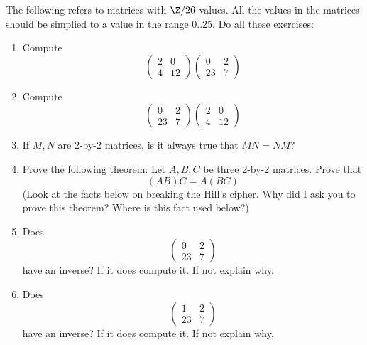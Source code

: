   The following refers to matrices with $\Z/26$ values.
  All the values in the matrices should be simplied to a value
  in the range 0..25.
  Do all these exercises:
  \begin{enumerate}[nosep]

  \item Compute
    \[
    \begin{pmatrix}
      2 & 0 \\
      4 & 12 
    \end{pmatrix}
    \begin{pmatrix}
      0 & 2 \\
      23 & 7 
    \end{pmatrix}
    \]
    
  \item Compute
    \[
    \begin{pmatrix}
      0 & 2 \\
      23 & 7 
    \end{pmatrix}
    \begin{pmatrix}
      2 & 0 \\
      4 & 12 
    \end{pmatrix}
    \]
    
  \item If $M,N$ are 2-by-2 matrices, is it always true that
    $MN = NM$?

    
  \item
    Prove the following theorem: Let $A,B,C$ be three 2-by-2 matrices.
    Prove that
    \[
    (AB)C = A(BC)
    \]
    (Look at the facts below on breaking the Hill's cipher.
    Why did I ask you to prove this theorem? Where is this
    fact used below?)

  \item
    Does
    \[
    \begin{pmatrix}
      0 & 2 \\
      23 & 7 
    \end{pmatrix}
    \]
    have an inverse? If it does compute it. If not explain why.
    
  \item
    Does
    \[
    \begin{pmatrix}
      1 & 2 \\
      23 & 7 
    \end{pmatrix}
    \]
    have an inverse? If it does compute it. If not explain why.
    

\end{enumerate}
